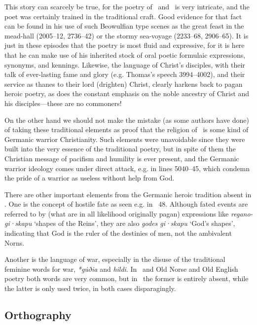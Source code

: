 This story can scarcely be true, for the poetry of \Heliand\ and \SaxonGenesis\ is very intricate, and the poet was certainly trained in the traditional craft.  Good evidence for that fact can be found in his use of such Beowulfian type scenes as the great feast in the mead-hall (2005–12, 2736–42) or the stormy sea-voyage (2233–68, 2906–65).  It is just in these episodes that the poetry is most fluid and expressive, for it is here that he can make use of his inherited stock of oral poetic formulaic expressions, synonyms, and kennings.  Likewise, the language of Christ’s disciples, with their talk of ever-lasting fame and glory (e.g. Thomas’s speech 3994–4002), and their service as thanes to their lord (drighten) Christ, clearly harkens back to pagan heroic poetry, as does the constant emphasis on the noble ancestry of Christ and his disciples—these are no commoners!

On the other hand we should not make the mistake (as some authors have done) of taking these traditional elements as proof that the religion of \Heliand\ is some kind of Germanic warrior Christianity.  Such elements were unavoidable since they were built into the very essence of the traditional poetry, but in spite of them the Christian message of pacifism and humility is ever present, and the Germanic warrior ideology comes under direct attack, e.g. in lines 5040–45, which condemn the pride of a warrior as useless without help from God.

There are other important elements from the Germanic heroic tradition absent in \Heliand.  One is the concept of hostile fate as seen e.g. in \Hildebrandslied\ 48.  Although fated events are referred to by (what are in all likelihood originally pagan) expressions like \emph{regano-gi·skapu} ‘shapes of the Reins’, they are also \emph{godes gi·skapu} ‘God’s shapes’, indicating that God is the ruler of the destinies of men, not the ambivalent Norns.

Another is the language of war, especially in the disuse of the traditional feminine words for war, \emph{*gu̇ðia} and \emph{hildi}.  In \Hildebrandslied\ and Old Norse and Old English poetry both words are very common, but in \Heliand\ the former is entirely absent, while the latter is only used twice, in both cases disparagingly.

\subsection{Orthography}

